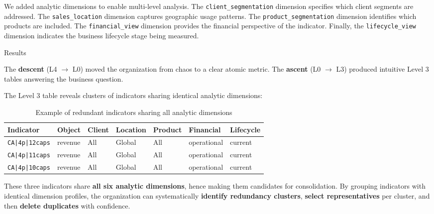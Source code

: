 \documentclass[]{hdsr}
\makeatletter
\def\subsubsection{\@startsection{subsubsection}{3}%
  \z@{.5\linespacing\@plus.7\linespacing}{.5\linespacing}%
  {\normalfont\bfseries}}
\theoremstyle{plain}      %
\theoremstyle{definition} %
\theoremstyle{remark}     %
\makeatother
\begin{document}
\vspace{1em}

We added analytic dimensions to enable multi-level analysis. The \texttt{client\_segmentation} dimension specifies which client segments are addressed. The \texttt{sales\_location} dimension captures geographic usage patterns. The \texttt{product\_segmentation} dimension identifies which products are included. The \texttt{financial\_view} dimension provides the financial perspective of the indicator. Finally, the \texttt{lifecycle\_view} dimension indicates the business lifecycle stage being measured.

\subsubsection{Results}

The \textbf{descent} (L4 $\to$ L0) moved the organization from chaos to a clear atomic metric. The \textbf{ascent} (L0 $\to$ L3) produced intuitive Level 3 tables answering the business question.

\noindent The Level 3 table reveals clusters of indicators sharing identical analytic dimensions:

\begin{table}[h]
\centering
\small
\begin{tabular}{@{}lllllll@{}}
\toprule
\textbf{Indicator} & \textbf{Object} & \textbf{Client} & \textbf{Location} & \textbf{Product} & \textbf{Financial} & \textbf{Lifecycle} \\ \midrule
\texttt{CA|4p|12caps} & revenue & All & Global & All & operational & current \\
\texttt{CA|4p|11caps} & revenue & All & Global & All & operational & current \\
\texttt{CA|4p|10caps} & revenue & All & Global & All & operational & current \\ \bottomrule
\end{tabular}
\caption{Example of redundant indicators sharing all analytic dimensions}
\end{table}

\noindent These three indicators share \textbf{all six analytic dimensions}, hence making them candidates for consolidation. By grouping indicators with identical dimension profiles, the organization can systematically \textbf{identify redundancy clusters}, \textbf{select representatives} per cluster, and then \textbf{delete duplicates} with confidence.
\end{document}
